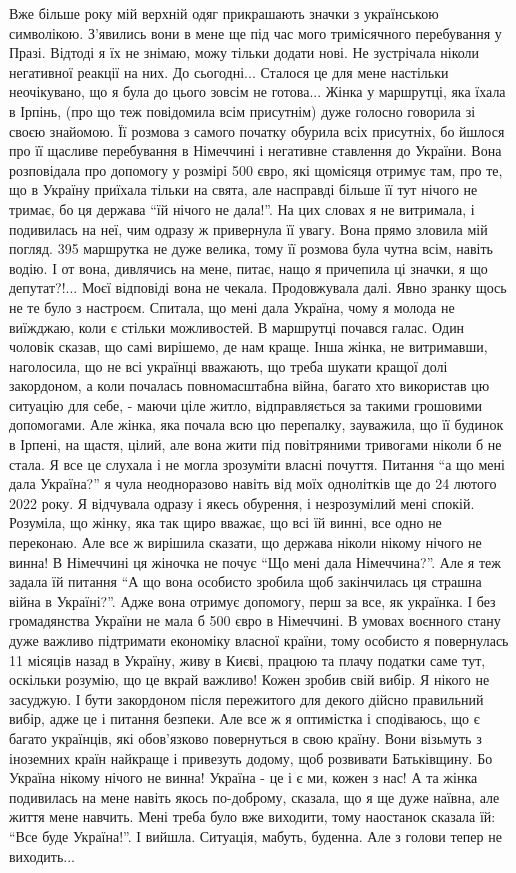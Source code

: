Вже більше року мій  верхній одяг прикрашають значки з українською символікою.
З'явились вони в мене ще під час мого тримісячного перебування у Празі. Відтоді
я їх не знімаю,  можу тільки додати нові. Не зустрічала ніколи негативної
реакції на них. До сьогодні... Сталося це для мене настільки неочікувано,  що я
була до цього зовсім не готова... Жінка у маршрутці, яка їхала в Ірпінь, (про
що теж повідомила всім присутнім) дуже голосно говорила зі своєю знайомою. Її
розмова з самого початку обурила всіх присутніх, бо йшлося про її щасливе
перебування в Німеччині і негативне ставлення до України. Вона розповідала про
допомогу у розмірі 500 євро, які щомісяця отримує там, про те, що в Україну
приїхала тільки  на свята, але насправді  більше її тут нічого не тримає, бо ця
держава \enquote{їй нічого не дала!}. На цих словах я не витримала, і подивилась на
неї, чим одразу ж привернула її увагу. Вона прямо зловила мій погляд. 395
маршрутка не дуже велика, тому її розмова була чутна всім, навіть водію. І от
вона, дивлячись на мене, питає, нащо я причепила ці значки, я що депутат?!...
Моєї відповіді вона не чекала. Продовжувала далі. Явно зранку щось не те було з
настроєм. Спитала, що мені дала Україна, чому я молода не виїжджаю, коли є
стільки можливостей. В маршрутці почався галас. Один чоловік сказав, що самі
вирішемо, де нам краще. Інша жінка, не витримавши, наголосила, що   не всі
українці вважають, що треба шукати кращої долі закордоном, а коли почалась
повномасштабна війна, багато хто використав цю ситуацію для себе, - маючи ціле
житло, відправляється за такими грошовими допомогами. Але жінка, яка почала всю
цю перепалку, зауважила, що її будинок в Ірпені, на щастя, цілий, але вона жити
під повітряними тривогами ніколи б не стала. Я все це слухала і не могла
зрозуміти власні почуття. Питання \enquote{а що мені дала Україна?} я чула неодноразово
навіть від моїх однолітків ще до 24 лютого 2022 року. Я відчувала одразу і
якесь обурення, і незрозумілий мені спокій. Розуміла, що жінку, яка так щиро
вважає, що всі їй винні, все одно не переконаю. Але все ж вирішила сказати, що
держава ніколи нікому нічого не винна! В Німеччині ця жіночка не почує \enquote{Що мені
дала Німеччина?}. Але я теж задала їй питання \enquote{А що вона особисто зробила щоб
закінчилась ця страшна війна в Україні?}. Адже вона отримує допомогу, перш за
все, як українка. І без громадянства України не мала б 500 євро в Німеччині. В
умовах воєнного стану дуже важливо підтримати економіку власної країни, тому
особисто я повернулась 11 місяців назад в Україну, живу в Києві,  працюю та
плачу податки саме тут, оскільки розумію, що це вкрай важливо! Кожен зробив
свій вибір. Я нікого не засуджую. І бути закордоном після пережитого для декого
дійсно правильний вибір, адже це і питання безпеки. Але все ж я оптимістка і
сподіваюсь, що є багато  українців, які обов'язково повернуться в свою країну.
Вони візьмуть з іноземних країн найкраще і привезуть додому, щоб розвивати
Батьківщину. Бо Україна нікому нічого не винна! Україна - це і є ми, кожен з
нас! А та жінка подивилась на мене навіть якось по-доброму, сказала, що я ще
дуже наївна, але життя мене навчить. Мені треба було вже виходити, тому
наостанок сказала їй: \enquote{Все буде Україна!}. І вийшла. Ситуація, мабуть, буденна.
Але з голови тепер не виходить...
